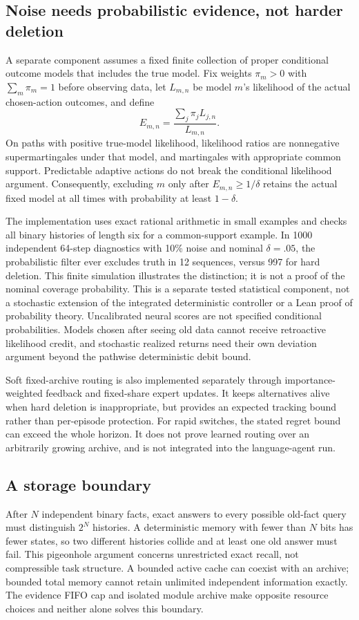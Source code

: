 \documentclass[10pt,twocolumn]{article}
\begin{document}
\subsection{Noise needs probabilistic evidence, not harder deletion}
A separate component assumes a fixed finite collection of proper conditional
outcome models that includes the true model. Fix weights $\pi_m>0$ with
$\sum_m\pi_m=1$ before observing data,
let $L_{m,n}$ be model $m$'s likelihood of the actual chosen-action outcomes,
and define
\begin{equation}
 E_{m,n}=\frac{\sum_j\pi_jL_{j,n}}{L_{m,n}}.
\end{equation}
On paths with positive true-model likelihood, likelihood ratios are nonnegative
supermartingales under that model, and martingales with appropriate common
support. Predictable adaptive actions do not break the conditional likelihood
argument. Consequently, excluding $m$ only after
$E_{m,n}\geq1/\delta$ retains the actual fixed model at all times with
probability at least $1-\delta$.

The implementation uses exact rational arithmetic in small examples and checks
all binary histories of length six for a common-support example. In 1000
independent 64-step diagnostics with 10\% noise and nominal $\delta=.05$, the
probabilistic filter ever excludes truth in 12 sequences, versus 997 for hard
deletion. This finite simulation illustrates the distinction; it is not a proof
of the nominal coverage probability. This is a
separate tested statistical component, not a stochastic extension of the
integrated deterministic controller or a Lean proof of probability theory.
Uncalibrated neural scores are not specified conditional probabilities. Models
chosen after seeing old data cannot receive retroactive likelihood credit, and
stochastic realized returns need their own deviation argument beyond the
pathwise deterministic debit bound.

Soft fixed-archive routing is also implemented separately through importance-
weighted feedback and fixed-share expert updates. It keeps alternatives alive
when hard deletion is inappropriate, but provides an expected tracking bound
rather than per-episode protection. For rapid switches, the stated regret bound
can exceed the whole horizon. It does not prove learned routing over an
arbitrarily growing archive, and is not integrated into the language-agent run.

\subsection{A storage boundary}
After $N$ independent binary facts, exact answers to every possible old-fact
query must distinguish $2^N$ histories. A deterministic memory with fewer than
$N$ bits has fewer states, so two different histories collide and at least one
old answer must fail. This pigeonhole argument concerns unrestricted exact
recall, not compressible task structure. A bounded active cache can coexist
with an archive; bounded total memory cannot retain unlimited independent
information exactly. The evidence FIFO cap and isolated module archive make
opposite resource choices and neither alone solves this boundary.
\end{document}
